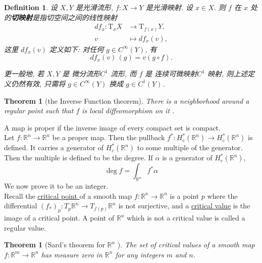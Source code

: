 \documentclass{article}
\newtheorem{definition}{Definition}[subsection]
\newtheorem{theorem}[proposition]{Theorem}
\begin{document}
\begin{definition}
    设 $X, Y$ 是光滑流形, $f \colon X \to Y$ 是光滑映射.
    设 $x \in X$. 则 $f$ 在 $x$ 处的\textbf{切映射}是指切空间之间的线性映射
    \begin{align*}
        df_x \colon \mathrm{T}_x X 
        & \longrightarrow \mathrm{T}_{f (x)} Y, \\
        v & \longmapsto df_x (v),
    \end{align*}
    这里 $df_x (v)$ 定义如下:
    对任何 $g \in C^\infty (Y)$, 有
    \[
        df_x (v) \, (g) =
        v (g \circ f).
    \]

    更一般地, 若 $X, Y$ 是 微分流形$C^1$ 流形,
    而 $f$ 是 连续可微映射$C^1$ 映射,
    则上述定义仍然有效,
    只需将 $g \in C^\infty (Y)$ 换成 $g \in C^1 (Y)$.
\end{definition}
\begin{theorem}[the Inverse Function theorem]
    There is a neighborhood around a regular point such that  $ f  $ is local diffeomorphism on it .
\end{theorem}
A map is proper if the inverse image of every compact set is compact.\\
Let  $ f:\mathbb{R}^n\rightarrow \mathbb{R}^n $ be a proper map. Then the pullback  $ f^*:H_c^*(\mathbb{R}^n)\rightarrow H^*_c(\mathbb{R }^n ) $ is defined. It carries a generator of  $ H_c^*(\mathbb{R}^n) $ to some multiple of the generator. Then the multiple is defined to be the degree. If  $ \alpha  $ is  a generator of  $ H_c^*(\mathbb{R }^n ) $,\[\deg f=\int_{\mathbb{R}^n}f^*\alpha\]   
We now prove it to be an integer.\\
Recall the  \underline{critical point } of a smooth map  $ f:\mathbb{R}^n\rightarrow \mathbb{R }^n  $ is a point   $ p $ where the differential   $ (f_*)_p:T_p\mathbb{R }^n \rightarrow T_{f(p)}\mathbb{R}^n $ is not surjective, and a \underline{critical value} is the image of a critical point. A point of  $ \mathbb{R }^n  $ which is not a critical value is called a regular value.
\begin{theorem}[Sard's theorem for  $ \mathbb{R}^n $ ]
    The set of critical values of a smooth map  $ f:\mathbb{R}^m\rightarrow \mathbb{R}^n  $  has measure zero in  $ \mathbb{R}^n $ for any integers  $ m  $ and  $ n $.
\end{theorem}
\end{document}
